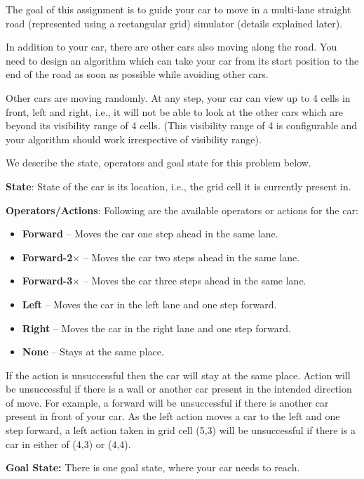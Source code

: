 \documentclass[12pt, letterpaper]{article}
\newcommand{\mybox}[1]{\par\noindent\colorbox{shadecolor}
{\parbox{\dimexpr\textwidth-2\fboxsep\relax}{#1}}}
\begin{document}
\mybox{The goal of this assignment is to guide your car to move in a multi-lane straight road (represented using a rectangular grid) simulator (details explained later). 

In addition to your car, there are other cars also moving along the road. You need to design an algorithm which can take your car from its start position to the end of the road as soon as possible while avoiding other cars. 

Other cars are moving randomly. At any step, your car can view up to 4 cells in front, left and right, i.e., it will not be able to look at the other cars which are beyond its visibility range of 4 cells. (This visibility range of 4 is configurable and your algorithm should work irrespective of visibility range).

We describe the state, operators and goal state for this problem below.

\textbf{State}: State of the car is its location, i.e., the grid cell it is currently present in. 

\textbf{Operators/Actions}: Following are the available operators or actions for the car:

\begin{itemize}
    \item \textbf{Forward} – Moves the car one step ahead in the same lane.
    \item \textbf{Forward-2$\times$} – Moves the car two steps ahead in the same lane.
    \item \textbf{Forward-3$\times$} – Moves the car three steps ahead in the same lane.
    \item \textbf{Left} – Moves the car in the left lane and one step forward.
    \item \textbf{Right} – Moves the car in the right lane and one step forward.
    \item \textbf{None} – Stays at the same place.
\end{itemize}

If the action is unsuccessful then the car will stay at the same place. Action will be unsuccessful if there is a wall or another car present in the intended direction of move. For example, a forward will be unsuccessful if there is another car present in front of your car.
As the left action moves a car to the left and one step forward, a left action taken in grid cell (5,3) will be unsuccessful if there is a car in either of (4,3) or (4,4).

\textbf{Goal State:} There is one goal state, where your car needs to reach.}
\end{document}

